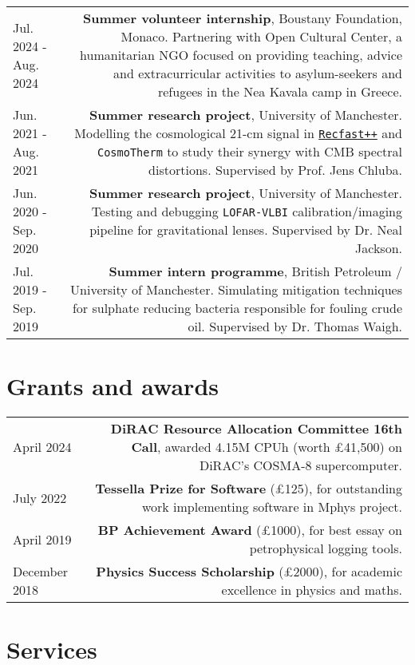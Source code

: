 \documentclass{article}
\begin{document}
\begin{longtable}{L!{\vrule}R}
    Jul. 2024 - Aug. 2024 & \textbf{Summer volunteer internship}, Boustany Foundation, Monaco. Partnering with Open Cultural Center, a humanitarian NGO focused on providing teaching, advice and extracurricular activities to asylum-seekers and refugees in the Nea Kavala camp in Greece.  \\
    Jun. 2021 - Aug. 2021 & \textbf{Summer research project}, University of Manchester. Modelling the cosmological 21-cm signal in \href{https://bitbucket.org/Jacetoto/recfast-.vx/src/Recfast_JD_21cm_modelling/}{\texttt{Recfast++}} and \texttt{CosmoTherm} to study their synergy with CMB spectral distortions. Supervised by Prof. Jens Chluba. \\
    Jun. 2020 - Sep. 2020 & \textbf{Summer research project}, University of Manchester. Testing and debugging \texttt{LOFAR-VLBI} calibration/imaging pipeline for gravitational lenses. Supervised by Dr. Neal Jackson.\\
    Jul. 2019 - Sep. 2019 & \textbf{Summer intern programme}, British Petroleum / University of Manchester. Simulating mitigation techniques for sulphate reducing bacteria responsible for fouling crude oil. Supervised by Dr. Thomas Waigh. \\
\end{longtable}

\section*{Grants and awards}

\begin{longtable}{L!{\vrule}R}

    April 2024 & \textbf{DiRAC Resource Allocation Committee 16th Call}, awarded 4.15M CPUh (worth £41,500) on DiRAC's COSMA-8 supercomputer. \\
    July 2022 & \textbf{Tessella Prize for Software} (£125), for outstanding work implementing software in Mphys project. \\
    April 2019 & \textbf{BP Achievement Award} (£1000), for best essay on petrophysical logging tools. \\
    December 2018 & \textbf{Physics Success Scholarship} (£2000), for academic excellence in physics and maths.\\

\end{longtable}

\section*{Services}
\end{document}
